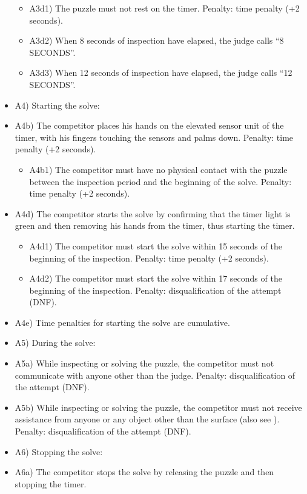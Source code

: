 \begin{itemize}
  \begin{itemize}
  \item
    A3d1) The puzzle must not rest on the timer. Penalty: time penalty
    (+2 seconds).
  \item
    A3d2) When 8 seconds of inspection have elapsed, the judge calls ``8
    SECONDS''.
  \item
    A3d3) When 12 seconds of inspection have elapsed, the judge calls
    ``12 SECONDS''.
  \end{itemize}
\item
  A4) Starting the solve:
\item
  A4b) The competitor places his hands on the elevated sensor unit of
  the timer, with his fingers touching the sensors and palms down.
  Penalty: time penalty (+2 seconds).

  \begin{itemize}
  \item
    A4b1) The competitor must have no physical contact with the puzzle
    between the inspection period and the beginning of the solve.
    Penalty: time penalty (+2 seconds).
  \end{itemize}
\item
  A4d) The competitor starts the solve by confirming that the timer
  light is green and then removing his hands from the timer, thus
  starting the timer.

  \begin{itemize}
  \item
    A4d1) The competitor must start the solve within 15 seconds of the
    beginning of the inspection. Penalty: time penalty (+2 seconds).
  \item
    A4d2) The competitor must start the solve within 17 seconds of the
    beginning of the inspection. Penalty: disqualification of the
    attempt (DNF).
  \end{itemize}
\item
  A4e) Time penalties for starting the solve are cumulative.
\item
  A5) During the solve:
\item
  A5a) While inspecting or solving the puzzle, the competitor must not
  communicate with anyone other than the judge. Penalty:
  disqualification of the attempt (DNF).
\item
  A5b) While inspecting or solving the puzzle, the competitor must not
  receive assistance from anyone or any object other than the surface
  (also see ). Penalty: disqualification of the attempt (DNF).
\item
  A6) Stopping the solve:
\item
  A6a) The competitor stops the solve by releasing the puzzle and then
  stopping the timer.


\end{itemize}
